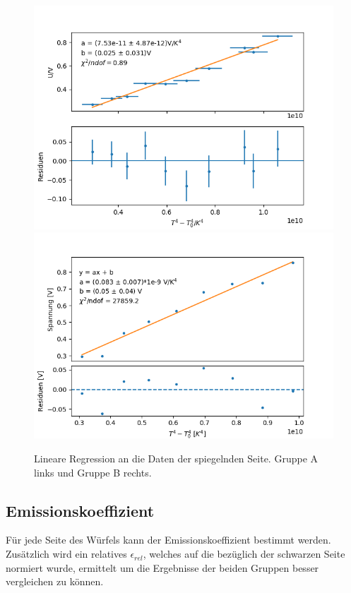 \documentclass[12pt,a4paper]{article}
\begin{document}
\begin{figure}
\centering
\includegraphics[scale=0.5]{Bilder/Spiegel_A}
\includegraphics[scale=0.5]{Bilder/spiegel_B}
\caption{Lineare Regression an die Daten der spiegelnden Seite. Gruppe A links und Gruppe B rechts.}
\label{fig:RegSpiegel}
\end{figure}




\subsection{Emissionskoeffizient}

Für jede Seite des Würfels kann der Emissionskoeffizient bestimmt werden. Zusätzlich wird ein relatives $\epsilon_{rel}$, welches auf die bezüglich der schwarzen Seite normiert wurde, ermittelt um die Ergebnisse der beiden Gruppen besser vergleichen zu können.
\end{document}

